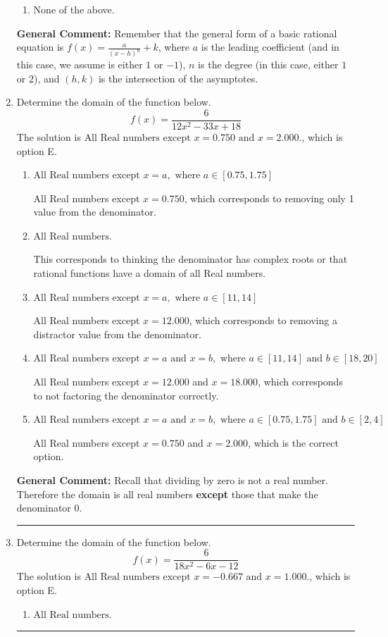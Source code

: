\documentclass{extbook}[14pt]
\newcommand{\litem}[1]{\item #1

\rule{\textwidth}{0.4pt}}
\begin{document}
\begin{enumerate}
{\begin{enumerate}[label=\Alph*.]
\begin{multicols}{2}
\end{multicols}\item None of the above.\end{enumerate}
\textbf{General Comment:} Remember that the general form of a basic rational equation is $ f(x) = \frac{a}{(x-h)^n} + k$, where $a$ is the leading coefficient (and in this case, we assume is either $1$ or $-1$), $n$ is the degree (in this case, either $1$ or $2$), and $(h, k)$ is the intersection of the asymptotes.
}
\litem{
Determine the domain of the function below.
\[ f(x) = \frac{6}{12x^{2} -33 x + 18} \]The solution is \( \text{All Real numbers except } x = 0.750 \text{ and } x = 2.000. \), which is option E.\begin{enumerate}[label=\Alph*.]
\item \( \text{All Real numbers except } x = a, \text{ where } a \in [0.75, 1.75] \)

All Real numbers except $x = 0.750$, which corresponds to removing only 1 value from the denominator.
\item \( \text{All Real numbers.} \)

This corresponds to thinking the denominator has complex roots or that rational functions have a domain of all Real numbers.
\item \( \text{All Real numbers except } x = a, \text{ where } a \in [11, 14] \)

All Real numbers except $x = 12.000$, which corresponds to removing a distractor value from the denominator.
\item \( \text{All Real numbers except } x = a \text{ and } x = b, \text{ where } a \in [11, 14] \text{ and } b \in [18, 20] \)

All Real numbers except $x = 12.000$ and $x = 18.000$, which corresponds to not factoring the denominator correctly.
\item \( \text{All Real numbers except } x = a \text{ and } x = b, \text{ where } a \in [0.75, 1.75] \text{ and } b \in [2, 4] \)

All Real numbers except $x = 0.750$ and $x = 2.000$, which is the correct option.
\end{enumerate}

\textbf{General Comment:} Recall that dividing by zero is not a real number. Therefore the domain is all real numbers \textbf{except} those that make the denominator 0.
}
\litem{
Determine the domain of the function below.
\[ f(x) = \frac{6}{18x^{2} -6 x -12} \]The solution is \( \text{All Real numbers except } x = -0.667 \text{ and } x = 1.000. \), which is option E.\begin{enumerate}[label=\Alph*.]
\item \( \text{All Real numbers.} \)


\end{enumerate}}
\end{enumerate}
\end{document}
